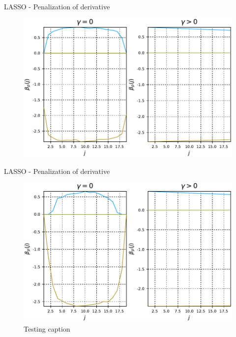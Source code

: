 \documentclass[11pt]{beamer}
\begin{document}
\begin{frame}{LASSO - Penalization of derivative}

\begin{figure}
\centering
\includegraphics[width=0.9\linewidth]{Images/Lambda500-gamma30.pdf}
\end{figure}

\end{frame}

\begin{frame}{LASSO - Penalization of derivative}

\begin{figure}
\centering
\includegraphics[width=0.7\linewidth]{Images/Lambda1000-gamma100.pdf}
\caption{Testing caption}
\end{figure}

\end{frame}
\end{document}
